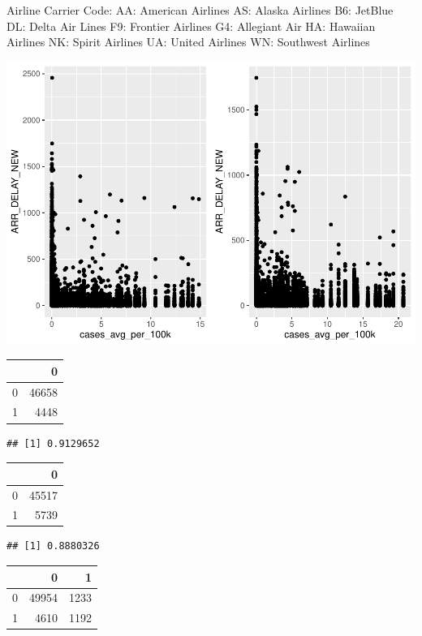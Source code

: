 \documentclass[
]{article}
\begin{document}
Airline Carrier Code: AA: American Airlines AS: Alaska Airlines B6:
JetBlue DL: Delta Air Lines F9: Frontier Airlines G4: Allegiant Air HA:
Hawaiian Airlines NK: Spirit Airlines UA: United Airlines WN: Southwest
Airlines

\includegraphics{final-project_files/figure-latex/scatterplot-1.pdf}

\begin{longtable}[]{@{}lr@{}}
\toprule
& 0 \\
\midrule
\endhead
0 & 46658 \\
1 & 4448 \\
\bottomrule
\end{longtable}

\begin{verbatim}
## [1] 0.9129652
\end{verbatim}

\begin{longtable}[]{@{}lr@{}}
\toprule
& 0 \\
\midrule
\endhead
0 & 45517 \\
1 & 5739 \\
\bottomrule
\end{longtable}

\begin{verbatim}
## [1] 0.8880326
\end{verbatim}

\begin{longtable}[]{@{}lrr@{}}
\toprule
& 0 & 1 \\
\midrule
\endhead
0 & 49954 & 1233 \\
1 & 4610 & 1192 \\
\bottomrule
\end{longtable}
\end{document}
